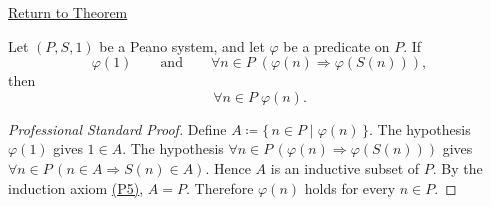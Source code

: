 \newpage
{}
\label{prf:induction-principle-for-peano-system}

\begin{remark*}[Return]
\hyperref[thm:induction-principle-for-peano-system]{Return to Theorem}
\end{remark*}

\begin{theorem*}
Let $(P,S,1)$ be a Peano system, and let $\varphi$ be a predicate on $P$.
If
\[
\varphi(1)
\qquad\text{and}\qquad
\forall n \in P\;(\varphi(n) \Longrightarrow \varphi(S(n))),
\]
then
\[
\forall n \in P\;\varphi(n).
\]
\end{theorem*}

\begin{proof}[Professional Standard Proof]
\LRAProofBodyStart
Define $A \coloneqq \{\,n \in P \mid \varphi(n)\,\}$.
The hypothesis $\varphi(1)$ gives $1 \in A$.
The hypothesis $\forall n \in P\,(\varphi(n) \Rightarrow \varphi(S(n)))$
gives $\forall n \in P\,(n \in A \Rightarrow S(n) \in A)$.
Hence $A$ is an inductive subset of $P$.
By the induction axiom \hyperref[ax:peano-induction]{(P5)}, $A = P$.
Therefore $\varphi(n)$ holds for every $n \in P$.
\end{proof}

